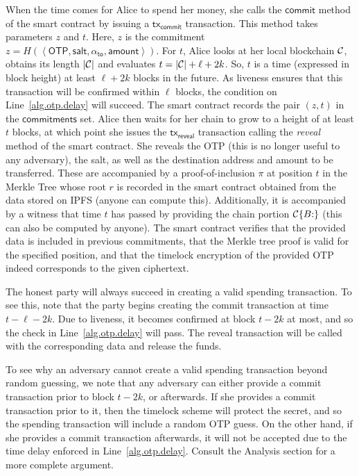 When the time comes for Alice to spend her money, she calls the $\textsf{commit}$ method
of the smart contract by issuing a $\textsf{tx}_\textsf{commit}$ transaction. This
method takes parameters $z$ and $t$. Here, $z$ is the commitment
$z = H(\left<\textsf{OTP}, \textsf{salt}, \alpha_{\textsf{to}}, \textsf{amount}\right>)$.
For $t$, Alice looks at her local blockchain $\mathcal{C}$, obtains its length $|\mathcal{C}|$
and evaluates $t = |\mathcal{C}| + \ell + 2k$.
So, $t$ is a time (expressed in block height) at least $\ell + 2k$ blocks in the future.
As liveness ensures that this transaction will be confirmed within $\ell$ blocks,
the condition on Line~\ref{alg.otp.delay} will succeed.
The smart contract records the pair $(z, t)$ in the $\textsf{commitments}$ set.
Alice then waits for her chain to grow to a height of at least $t$ blocks,
at which point she issues the $\textsf{tx}_\textsf{reveal}$ transaction
calling the \emph{reveal} method of the smart contract. She reveals
the OTP (this is no longer useful to any adversary), the salt, as well as
the destination address and amount to be transferred. These are accompanied
by a proof-of-inclusion $\pi$ at position $t$ in the Merkle Tree whose root $r$
is recorded in the smart contract obtained from the data stored on IPFS
(anyone can compute this). Additionally, it is accompanied by a witness that
time $t$ has passed by providing the chain portion $\mathcal{C}\{B{:}\}$ (this can
also be computed by anyone). The smart contract verifies that the provided
data is included in previous commitments, that the Merkle tree proof is
valid for the specified position, and that the timelock encryption of the
provided OTP indeed corresponds to the given ciphertext.

The honest party will always succeed in creating a valid spending transaction.
To see this, note that the party begins creating the commit transaction at time
$t - \ell - 2k$. Due to liveness, it becomes confirmed at block $t - 2k$ at most,
and so the check in Line~\ref{alg.otp.delay} will pass. The reveal transaction will
be called with the corresponding data and release the funds.

To see why an adversary cannot create a valid spending transaction beyond random
guessing, we note that any adversary can either provide a commit transaction prior
to block $t - 2k$, or afterwards. If she provides a commit transaction
prior to it, then the timelock scheme will protect the secret, and so the spending
transaction will include a random OTP guess. On the other hand, if she provides a
commit transaction afterwards, it will not be accepted due to the time delay enforced
in Line~\ref{alg.otp.delay}. Consult the Analysis section for a more complete argument.

